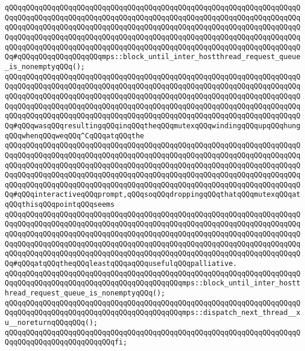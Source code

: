 \verb|qQQqqQQqqQQqqQQqqQQqqQQqqQQqqQQqqQQqqQQqqQQqqQQqqQQqqQQqqQQqqQQqqQQqqQQqqQQqqQQqqQQqqQQqqQQqqQQqqQQqqQQqqQQqqQQqqQQqqQQqqQQqqQQqqQQqqQQqqQQqqQQqqQQqqQQqqQQqqQQqqQQqqQQqqQQqqQQqqQQqqQQqqQQqqQQqqQQqqQQqqQQqqQQqqQQqqQQqqQQqqQQqqQQqqQQqqQQqqQQqqQQqqQQqqQQqqQQqqQQqqQQqqQQqqQQqqQQqqQQqqQQqqQQqqQQqqQQqqQQqqQQqqQQqqQQqqQQqqQQqqQQqqQQqqQQqqQQqqQQqqQQqqQQqqQQq#qQQqqQQqqQQqqQQqqQQqmps::block_until_inter_hostthread_request_queue_is_nonemptyqQQq();|\newline
\verb|qQQqqQQqqQQqqQQqqQQqqQQqqQQqqQQqqQQqqQQqqQQqqQQqqQQqqQQqqQQqqQQqqQQqqQQqqQQqqQQqqQQqqQQqqQQqqQQqqQQqqQQqqQQqqQQqqQQqqQQqqQQqqQQqqQQqqQQqqQQqqQQqqQQqqQQqqQQqqQQqqQQqqQQqqQQqqQQqqQQqqQQqqQQqqQQqqQQqqQQqqQQqqQQqqQQqqQQqqQQqqQQqqQQqqQQqqQQqqQQqqQQqqQQqqQQqqQQqqQQqqQQqqQQqqQQqqQQqqQQqqQQqqQQqqQQqqQQqqQQqqQQqqQQqqQQqqQQqqQQqqQQqqQQqqQQqqQQqqQQqqQQqqQQqqQQq#qQQqwasqQQqresultingqQQqinqQQqtheqQQqmutexqQQqwindingqQQqupqQQqhungqQQqwhenqQQqweqQQq^CqQQqatqQQqthe|\newline
\verb|qQQqqQQqqQQqqQQqqQQqqQQqqQQqqQQqqQQqqQQqqQQqqQQqqQQqqQQqqQQqqQQqqQQqqQQqqQQqqQQqqQQqqQQqqQQqqQQqqQQqqQQqqQQqqQQqqQQqqQQqqQQqqQQqqQQqqQQqqQQqqQQqqQQqqQQqqQQqqQQqqQQqqQQqqQQqqQQqqQQqqQQqqQQqqQQqqQQqqQQqqQQqqQQqqQQqqQQqqQQqqQQqqQQqqQQqqQQqqQQqqQQqqQQqqQQqqQQqqQQqqQQqqQQqqQQqqQQqqQQqqQQqqQQqqQQqqQQqqQQqqQQqqQQqqQQqqQQqqQQqqQQqqQQqqQQqqQQqqQQqqQQqqQQqqQQq#qQQqinteractiveqQQqprompt,qQQqsoqQQqdroppingqQQqthatqQQqmutexqQQqatqQQqthisqQQqpointqQQqseems|\newline
\verb|qQQqqQQqqQQqqQQqqQQqqQQqqQQqqQQqqQQqqQQqqQQqqQQqqQQqqQQqqQQqqQQqqQQqqQQqqQQqqQQqqQQqqQQqqQQqqQQqqQQqqQQqqQQqqQQqqQQqqQQqqQQqqQQqqQQqqQQqqQQqqQQqqQQqqQQqqQQqqQQqqQQqqQQqqQQqqQQqqQQqqQQqqQQqqQQqqQQqqQQqqQQqqQQqqQQqqQQqqQQqqQQqqQQqqQQqqQQqqQQqqQQqqQQqqQQqqQQqqQQqqQQqqQQqqQQqqQQqqQQqqQQqqQQqqQQqqQQqqQQqqQQqqQQqqQQqqQQqqQQqqQQqqQQqqQQqqQQqqQQqqQQqqQQqqQQq#qQQqatqQQqtheqQQqleastqQQqaqQQqusefulqQQqpalliative.|\newline
\newline
\verb|qQQqqQQqqQQqqQQqqQQqqQQqqQQqqQQqqQQqqQQqqQQqqQQqqQQqqQQqqQQqqQQqqQQqqQQqqQQqqQQqqQQqqQQqqQQqqQQqqQQqqQQqqQQqqQQqmps::block_until_inter_hostthread_request_queue_is_nonemptyqQQq();|\newline
\verb|qQQqqQQqqQQqqQQqqQQqqQQqqQQqqQQqqQQqqQQqqQQqqQQqqQQqqQQqqQQqqQQqqQQqqQQqqQQqqQQqqQQqqQQqqQQqqQQqqQQqqQQqqQQqqQQqmps::dispatch_next_thread__xu__noreturnqQQqqQQq();|\newline
\verb|qQQqqQQqqQQqqQQqqQQqqQQqqQQqqQQqqQQqqQQqqQQqqQQqqQQqqQQqqQQqqQQqqQQqqQQqqQQqqQQqqQQqqQQqqQQqqQQqfi;|\newline
